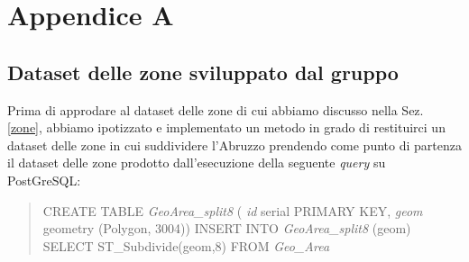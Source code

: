 \chapter{Appendice A}
\label{appendiceA}
\section{Dataset delle zone sviluppato dal gruppo}
\label{nostraProposta}
Prima di approdare al dataset delle zone di cui abbiamo discusso nella Sez. \ref{zone}, abbiamo ipotizzato e implementato un metodo in grado di restituirci un dataset delle zone in cui suddividere l'Abruzzo prendendo come punto di partenza il dataset delle zone prodotto dall'esecuzione della seguente \textit{query} su PostGreSQL:
\begin{quote}
CREATE TABLE \textit{GeoArea\_split8} (
\newline
\textit{id} serial PRIMARY KEY,
\newline
\textit{geom} geometry (Polygon, 3004))
\newline
\newline
INSERT INTO \textit{GeoArea\_split8} (geom) 
\newline
SELECT ST\_Subdivide(geom,8)
\newline
FROM \textit{Geo\_Area}
\end{quote}

